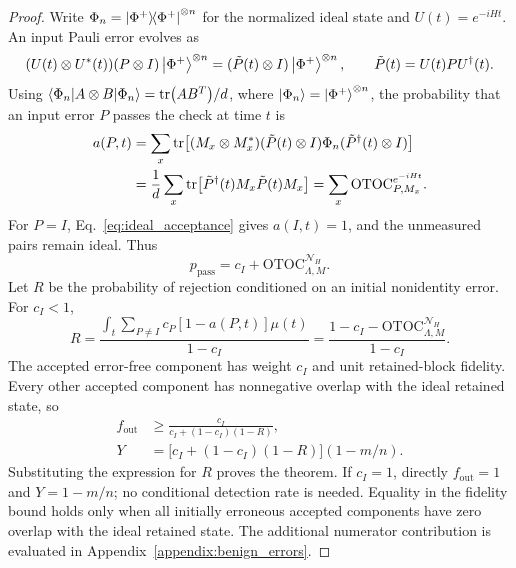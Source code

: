 \documentclass[onecolumn,prx,longbibliography,nofootinbib, superscriptaddress]{revtex4-2}
\theoremstyle{recap}
\begin{document}
\begin{proof}
Write $\Phi_n=\ketbra{\Phi^+}{\Phi^+}^{\otimes n}$ for the normalized ideal state and $U(t)=e^{-iHt}$. An input Pauli error evolves as
\begin{equation}
    (U(t)\otimes U^*(t))(P\otimes I)\ket{\Phi^+}^{\otimes n}
    =(\tilde P(t)\otimes I)\ket{\Phi^+}^{\otimes n},\qquad
    \tilde P(t)=U(t)PU^{\dagger}(t).
\end{equation}
Using $\langle\Phi_n|A\otimes B|\Phi_n\rangle=\tr(AB^T)/d$, where $|\Phi_n\rangle=\ket{\Phi^+}^{\otimes n}$, the probability that an input error $P$ passes the check at time $t$ is
\begin{equation}
\begin{split}
    a(P,t)&=\sum_x\tr\!\left[(M_x\otimes M_x^*)
      (\tilde P(t)\otimes I)\Phi_n(\tilde P^{\dagger}(t)\otimes I)\right]\\
    &=\frac{1}{d}\sum_x\tr\!\left[\tilde P^{\dagger}(t)M_x\tilde P(t)M_x\right]
      =\sum_x\mathrm{OTOC}_{P,M_x}^{e^{-iHt}}.
\end{split}
\end{equation}
For $P=I$, Eq.~\eqref{eq:ideal_acceptance} gives $a(I,t)=1$, and the unmeasured pairs remain ideal. Thus
\begin{equation}
    p_{\mathrm{pass}}=c_I+\mathrm{OTOC}_{\Lambda,M}^{\mathcal{N}_H}.
\end{equation}
Let $R$ be the probability of rejection conditioned on an initial nonidentity error. For $c_I<1$,
\begin{equation}
    R=\frac{\int_t\sum_{P\neq I}c_P[1-a(P,t)]\mu(t)}{1-c_I}
     =\frac{1-c_I-\mathrm{OTOC}_{\Lambda,M}^{\mathcal{N}_H}}{1-c_I}.
\end{equation}
The accepted error-free component has weight $c_I$ and unit retained-block fidelity. Every other accepted component has nonnegative overlap with the ideal retained state, so
\begin{equation}\label{eq:rate&fidelity}
\begin{split}
    f_{\mathrm{out}}&\geq\frac{c_I}{c_I+(1-c_I)(1-R)},\\
    Y&=\bigl[c_I+(1-c_I)(1-R)\bigr](1-m/n).
\end{split}
\end{equation}
Substituting the expression for $R$ proves the theorem. If $c_I=1$, directly $f_{\mathrm{out}}=1$ and $Y=1-m/n$; no conditional detection rate is needed. Equality in the fidelity bound holds only when all initially erroneous accepted components have zero overlap with the ideal retained state. The additional numerator contribution is evaluated in Appendix~\ref{appendix:benign_errors}.
\end{proof}
\end{document}
